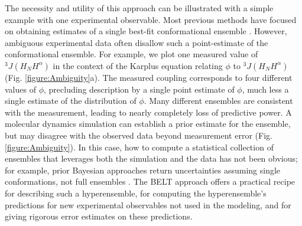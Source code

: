 \documentclass[journal=jacsat,manuscript=article]{achemso}
\begin{document}
The necessity and utility of this approach can be illustrated with a simple example with one experimental observable. Most previous methods have focused on obtaining estimates of a single best-fit conformational ensemble  \cite{rozycki2011saxs,  Graf2007, chodera2012}.  However, ambiguous experimental data often disallow such a point-estimate of the conformational ensemble.  For example, we plot one measured  \cite{Graf2007} value of $^3J(H_NH^\alpha)$ in the context of the Karplus \cite{vogeli2007limits} equation relating $\phi$ to $^3J(H_NH^\alpha)$ (Fig. \ref{figure:Ambiguity}a).  The measured coupling corresponds to four different values of $\phi$, precluding description by a single point estimate of $\phi$, much less a single estimate of the distribution of $\phi$. Many different ensembles are consistent with the measurement, leading to nearly completely loss of predictive power. A molecular dynamics simulation can establish a prior estimate for the ensemble, but may disagree with the observed data 
beyond measurement error (Fig. \ref{figure:Ambiguity}). In this case, how to compute a statistical collection of ensembles that leverages both the simulation and the data has not been obvious; for example, prior Bayesian approaches return uncertainties assuming single conformations, not full ensembles \cite{rieping2005}.  The BELT approach offers a practical recipe for describing such a hyperensemble, for computing the hyperensemble's predictions for new experimental observables not used in the modeling, and for giving rigorous error estimates on these predictions.
\end{document}
